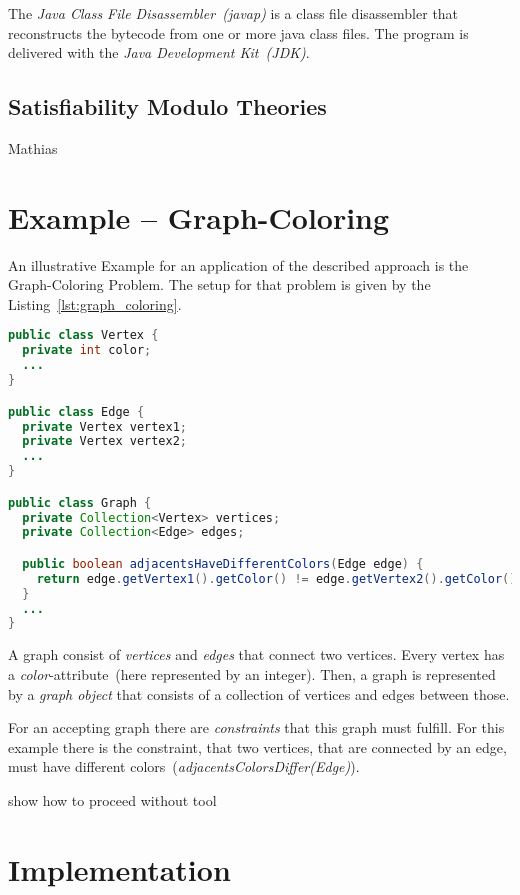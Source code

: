 \documentclass[conference]{IEEEtran}
\begin{document}
The \emph{Java Class File Disassembler~(javap)} is a class file disassembler
that reconstructs the bytecode from one or more java class files. The program
is delivered with the \emph{Java Development Kit~(JDK)}.

\subsection{Satisfiability Modulo Theories}
\label{sec:prelim_smt}

\danger Mathias

\section{Example -- Graph-Coloring}
\label{sec:example}

An illustrative Example for an application of the described approach is the
Graph-Coloring Problem. The setup for that problem is given by the
Listing~\ref{lst:graph_coloring}.

\begin{lstlisting}[language=java,label=lst:graph_coloring,
    caption=Example]
public class Vertex {
  private int color;
  ...
}

public class Edge {
  private Vertex vertex1;
  private Vertex vertex2;
  ...
}

public class Graph {
  private Collection<Vertex> vertices;
  private Collection<Edge> edges;

  public boolean adjacentsHaveDifferentColors(Edge edge) {
    return edge.getVertex1().getColor() != edge.getVertex2().getColor();
  }
  ...
}
\end{lstlisting}

A graph consist of \emph{vertices} and \emph{edges} that connect two vertices.
Every vertex has a \emph{color}-attribute~(here represented by an integer).
Then, a graph is represented by a \emph{graph object} that consists of a
collection of vertices and edges between those.

For an accepting graph there are \emph{constraints} that this graph must
fulfill. For this example there is the constraint, that two vertices, that are
connected by an edge, must have different
colors~(\emph{adjacentsColorsDiffer(Edge)}).

\danger show how to proceed without tool

\section{Implementation}
\label{sec:implementation}
\end{document}

